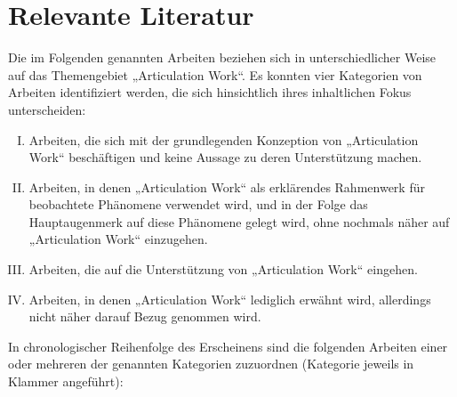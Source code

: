 
\section{Relevante Literatur} %
\label{sec:relevante_literatur}

Die im Folgenden genannten Arbeiten beziehen sich in unterschiedlicher Weise auf das Themengebiet „Articulation Work“. Es konnten vier Kategorien von Arbeiten identifiziert werden, die sich hinsichtlich ihres inhaltlichen Fokus unterscheiden:
\begin{enumerate}[(I)]
	\item Arbeiten, die sich mit der grundlegenden Konzeption von „Articulation Work“ beschäftigen und keine Aussage zu deren Unterstützung machen.
	\item Arbeiten, in denen „Articulation Work“ als erklärendes Rahmenwerk für beobachtete Phänomene verwendet wird, und in der Folge das Hauptaugenmerk auf diese Phänomene gelegt wird, ohne nochmals näher auf „Articulation Work“ einzugehen.
	\item Arbeiten, die auf die Unterstützung von „Articulation Work“ eingehen.
	\item Arbeiten, in denen „Articulation Work“ lediglich erwähnt wird, allerdings nicht näher darauf Bezug genommen wird.
\end{enumerate}

In chronologischer Reihenfolge des Erscheinens sind die folgenden Arbeiten einer oder mehreren der genannten Kategorien zuzuordnen (Kategorie jeweils in Klammer angeführt):

